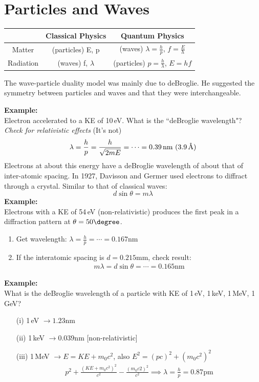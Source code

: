 \documentclass[a4paper, 11pt, normalem]{report}
\begin{document}
\section{Particles and Waves}
\begin{table}[H]
    \centering
    \begin{tabular}{|c|c|c|}
        \hline
        \rowcolor{lightgray} & Classical Physics & Quantum Physics \\
        \hline
        Matter & (particles) E, p & (waves) $\lambda = \frac{h}{p}$, $f = \frac{E}{h}$ \\
        \hline
        Radiation & (waves) f, $\lambda$ & (particles) $p = \frac{h}{\lambda}$, $E = hf$\\
        \hline
    \end{tabular}
\end{table}
The wave-particle duality model was mainly due to deBroglie.
He suggested the symmetry between particles and waves and that they were interchangeable.

\textbf{Example:}\\
Electron accelerated to a KE of 10\,eV.
What is the ``deBroglie wavelength"?
\emph{Check for relativistic effects} (It's not)
\begin{equation}
    \lambda = \frac{h}{p} = \frac{h}{\sqrt{2mE}} = \cdots = 0.39\,\text{nm}~(3.9\,\text{\r{A}})
\end{equation}
Electrons at about this energy have a deBroglie wavelength of about that of inter-atomic spacing.
In 1927, Davisson and Germer used electrons to diffract through a crystal.
Similar to that of classical waves:
\begin{equation}
    d\sin{\theta} = m\lambda
\end{equation}
\textbf{Example:}\\
Electrons with a KE of 54\,eV (non-relativistic) produces the first peak in a diffraction pattern at $\theta = 50\degree$.
\begin{enumerate}
    \item Get wavelength: $\lambda = \frac{h}{p} = \cdots = 0.167$nm
    \item If the interatomic spacing is $d = 0.215$mm, check result:
        \begin{align}
            m\lambda = d\sin{\theta} = \cdots = 0.165\text{nm}
        \end{align}
\end{enumerate}
\textbf{Example:}\\
What is the deBroglie wavelength of a particle with KE of 1\,eV, 1\,keV, 1\,MeV, 1\,GeV?
\begin{enumerate}
    \item[(i)] 1\,eV $\rightarrow 1.23$nm
    \item[(ii)] 1\,keV $\rightarrow 0.039$nm [non-relativistic]
    \item[(iii)] 1\,MeV $\rightarrow E = KE + m_{0}c^{2}$, also $E^{2} = (pc)^{2} + (m_{0}c^{2})^{2}$
        \begin{align}
            p^{2} + \frac{(KE + m_{0}c^{2})^{2}}{c^{2}} - \frac{(m_{0}c{2})^{2}}{c^{2}} \implies \lambda = \frac{h}{p} = 0.87\text{pm}
        \end{align}
\end{enumerate}
\end{document}
